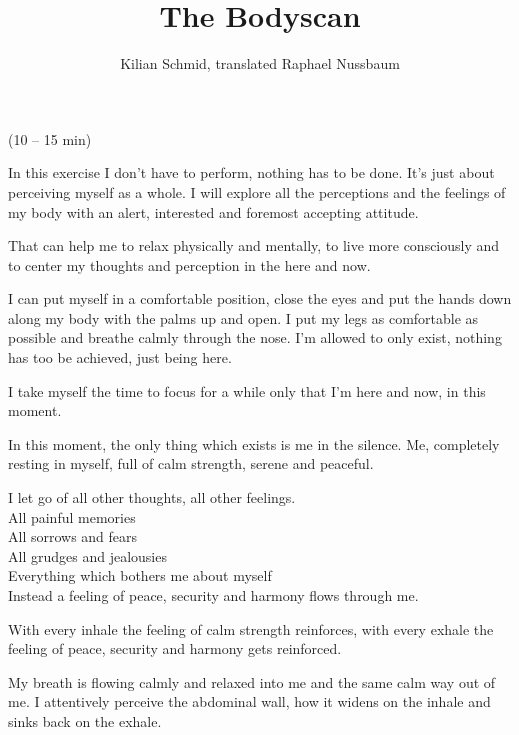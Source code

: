 \documentclass[12pt]{article}
\title{The Bodyscan}
\author{Kilian Schmid, translated Raphael Nussbaum}
\date{}
\begin{document}
\maketitle
\noindent (10 -- 15 min)

\vspace{4mm}
In this exercise I don't have to perform, nothing has to be done. It's just about perceiving myself as a whole. I will explore all the perceptions and the feelings of my body with an alert, interested and foremost accepting attitude.

\vspace{6mm}
That can help me to relax physically and mentally, to live more consciously and to center my thoughts and perception in the here and now.

\vspace{6mm}
I can put myself in a comfortable position, close the eyes and put the hands down along my body with the palms up and open. I put my legs as comfortable as possible and breathe calmly through the nose. I'm allowed to only exist, nothing has too be achieved, just being here.

\vspace{6mm}
I take myself the time to focus for a while only that I'm here and now, in this moment.

\vspace{6mm}
In this moment, the only thing which exists is me in the silence. Me, completely resting in myself, full of calm strength, serene and peaceful.

\vspace{6mm}
I let go of all other thoughts, all other feelings.\\
All painful memories\\
All sorrows and fears\\
All grudges and jealousies\\
Everything which bothers me about myself\\
Instead a feeling of peace, security and harmony flows through me.

\vspace{6mm}
With every inhale the feeling of calm strength reinforces, with every exhale the feeling of peace, security and harmony gets reinforced.

\vspace{6mm}
My breath is flowing calmly and relaxed into me and the same calm way out of me. I attentively perceive the abdominal wall, how it widens on the inhale and sinks back on the exhale.
\end{document}
